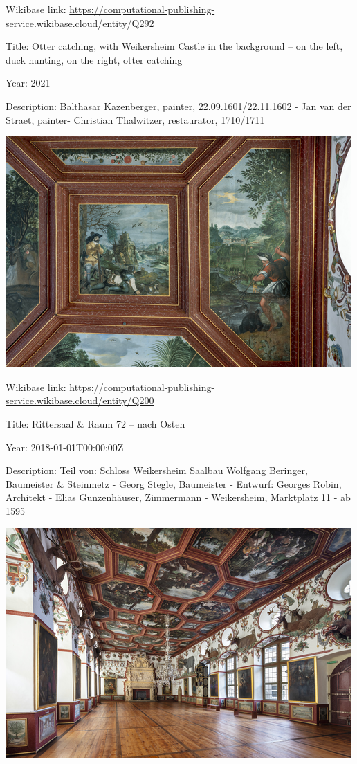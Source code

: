 \documentclass[
  letterpaper,
]{book}
\begin{document}
Wikibase link:
\url{https://computational-publishing-service.wikibase.cloud/entity/Q292}

Title: Otter catching, with Weikersheim Castle in the background -- on
the left, duck hunting, on the right, otter catching

Year: 2021

Description: Balthasar Kazenberger, painter, 22.09.1601/22.11.1602 - Jan
van der Straet, painter- Christian Thalwitzer, restaurator, 1710/1711

\includegraphics{paintings_files/figure-pdf/cell-3-output-54.png}

Wikibase link:
\url{https://computational-publishing-service.wikibase.cloud/entity/Q200}

Title: Rittersaal \& Raum 72 -- nach Osten

Year: 2018-01-01T00:00:00Z

Description: Teil von: Schloss Weikersheim Saalbau Wolfgang Beringer,
Baumeister \& Steinmetz - Georg Stegle, Baumeister - Entwurf: Georges
Robin, Architekt - Elias Gunzenhäuser, Zimmermann - Weikersheim,
Marktplatz 11 - ab 1595

\includegraphics{paintings_files/figure-pdf/cell-3-output-56.png}
\end{document}
